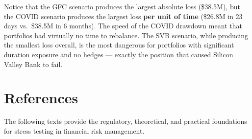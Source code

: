 \documentclass[11pt, a4paper]{article}
\theoremstyle{definition}
\theoremstyle{plain}
\theoremstyle{remark}
\begin{document}
\begin{interpbox}
Notice that the GFC scenario produces the largest absolute loss (\$38.5M),
but the COVID scenario produces the largest loss \textbf{per unit of time}
(\$26.8M in 23 days vs.\ \$38.5M in 6 months).
The speed of the COVID drawdown meant that portfolios had virtually no time to rebalance.
The SVB scenario, while producing the smallest loss overall,
is the most dangerous for portfolios with significant duration exposure and no hedges ---
exactly the position that caused Silicon Valley Bank to fail.
\end{interpbox}

\section{References}
\label{sec:references}

The following texts provide the regulatory, theoretical, and practical foundations
for stress testing in financial risk management.
\end{document}
